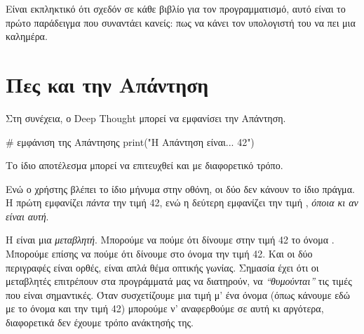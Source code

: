 \documentclass[a4paper,11pt,oneside]{book}
\begin{document}
Είναι εκπληκτικό ότι σχεδόν σε κάθε βιβλίο για τον προγραμματισμό, αυτό είναι το πρώτο παράδειγμα που συναντάει κανείς: πως να κάνει τον υπολογιστή του να πει μια καλημέρα.


\section{Πες και την Απάντηση}

Στη συνέχεια, ο Deep Thought μπορεί να εμφανίσει την Απάντηση.

\begin{pycode}
# εμφάνιση της Απάντησης
print("Η Απάντηση είναι... 42")
\end{pycode}

Το ίδιο αποτέλεσμα μπορεί να επιτευχθεί και με διαφορετικό τρόπο.


Ενώ ο χρήστης βλέπει το ίδιο μήνυμα στην οθόνη, οι δύο  δεν κάνουν το ίδιο πράγμα. Η πρώτη εμφανίζει \emph{πάντα} την τιμή 42, ενώ η δεύτερη εμφανίζει την τιμή , \emph{όποια κι αν είναι αυτή}.

Η  είναι μια \emph{μεταβλητή}. Μπορούμε να πούμε ότι δίνουμε στην τιμή 42 το όνομα . Μπορούμε επίσης να πούμε ότι δίνουμε στο όνομα  την τιμή 42. Και οι δύο περιγραφές είναι ορθές, είναι απλά θέμα οπτικής γωνίας. 
Σημασία έχει ότι οι μεταβλητές επιτρέπουν στα προγράμματά μας να διατηρούν, να \emph{``θυμούνται''} τις τιμές που είναι σημαντικές. Όταν συσχετίζουμε μια τιμή μ' ένα όνομα (όπως κάνουμε εδώ με το όνομα  και την τιμή 42) μπορούμε ν' αναφερθούμε σε αυτή κι αργότερα, διαφορετικά δεν έχουμε τρόπο ανάκτησής της.
\end{document}
